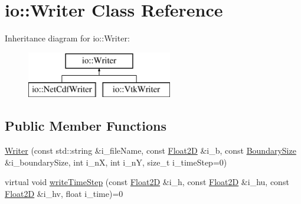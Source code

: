 \hypertarget{classio_1_1Writer}{\section{io\-:\-:Writer Class Reference}
\label{classio_1_1Writer}
}
Inheritance diagram for io\-:\-:Writer\-:\begin{figure}[H]
\begin{center}
\leavevmode
\includegraphics[height=2.000000cm]{classio_1_1Writer}
\end{center}
\end{figure}
\subsection*{Public Member Functions}
\begin{DoxyCompactItemize}
\item 
\hyperlink{classio_1_1Writer_a05648cc3fcfaf3d7d4267a584685f6f3}{Writer} (const std\-::string \&i\-\_\-file\-Name, const \hyperlink{classFloat2D}{Float2\-D} \&i\-\_\-b, const \hyperlink{structio_1_1BoundarySize}{Boundary\-Size} \&i\-\_\-boundary\-Size, int i\-\_\-n\-X, int i\-\_\-n\-Y, size\-\_\-t i\-\_\-time\-Step=0)
\item 
virtual void \hyperlink{classio_1_1Writer_a9ac05caa91aca4e79094d6718a2da16c}{write\-Time\-Step} (const \hyperlink{classFloat2D}{Float2\-D} \&i\-\_\-h, const \hyperlink{classFloat2D}{Float2\-D} \&i\-\_\-hu, const \hyperlink{classFloat2D}{Float2\-D} \&i\-\_\-hv, float i\-\_\-time)=0
\end{DoxyCompactItemize}
